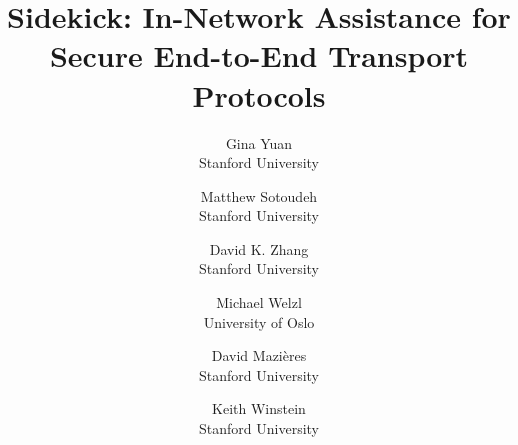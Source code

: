\usepackage[english]{babel}
\usepackage{blindtext}
\usepackage{hyperref}
\usepackage{enumitem}
\usepackage{cleveref}
\usepackage{booktabs}
\usepackage{listings}
\usepackage{booktabs}
\usepackage{subcaption}
\usepackage{float}
\usepackage{xcolor}
\usepackage[compact]{titlesec}



\newcommand{\sys}{sidekick\xspace}
\newcommand{\Sys}{Sidekick\xspace}
\newcommand{\michael}[1]{\textcolor{red}{{\sf (MW: #1)}}}
\newcommand{\keith}[1]{\textcolor{red}{{\sf (KW: #1)}}}
\newcommand{\masot}[1]{\textcolor{red}{{\sf (MS: #1)}}}
\newcommand{\gina}[1]{\textcolor{red}{\sf {(GY: #1)}}}
\newcommand{\dm}[1]{\textcolor{red}{\sf (DM: #1)}}

\date{}

\title{\Sys: In-Network Assistance for Secure End-to-End Transport Protocols}

\author{
{\rm Gina Yuan}\\
Stanford University
\and
{\rm Matthew Sotoudeh}\\
Stanford University
\and
{\rm David K. Zhang}\\
Stanford University
\and
{\rm Michael Welzl}\\
University of Oslo
\and
{\rm David Mazières}\\
Stanford University
\and
{\rm Keith Winstein}\\
Stanford University
} %


\maketitle

\pagestyle{empty}



